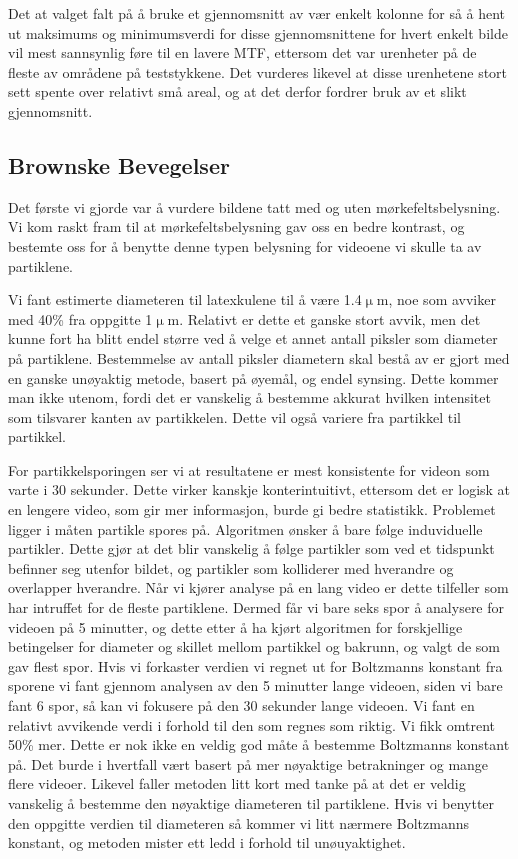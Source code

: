 \documentclass[a4paper,11pt, twocolumn]{article}
\begin{document}
Det at valget falt på å bruke et gjennomsnitt av vær enkelt kolonne for så å hent ut maksimums og minimumsverdi for disse gjennomsnittene for hvert enkelt bilde vil mest sannsynlig føre til en lavere MTF, ettersom det var urenheter på de fleste av områdene på teststykkene. Det vurderes likevel at disse urenhetene stort sett spente over relativt små areal, og at det derfor fordrer bruk av et slikt gjennomsnitt.

\subsection{Brownske Bevegelser}
Det første vi gjorde var å vurdere bildene tatt med og uten mørkefeltsbelysning. Vi kom raskt fram til at mørkefeltsbelysning gav oss en bedre kontrast, og bestemte oss for å benytte denne typen belysning for videoene vi skulle ta av partiklene.

Vi fant estimerte diameteren til latexkulene til å være 1.4$\upmu$m, noe som avviker med 40\% fra oppgitte 1$\upmu$m. Relativt er dette et ganske stort avvik, men det kunne fort ha blitt endel større ved å velge et annet antall piksler som diameter på partiklene. Bestemmelse av antall piksler diametern skal bestå av er gjort med en ganske unøyaktig metode, basert på øyemål, og endel synsing. Dette kommer man ikke utenom, fordi det er vanskelig å bestemme akkurat hvilken intensitet som tilsvarer kanten av partikkelen. Dette vil også variere fra partikkel til partikkel.

For partikkelsporingen ser vi at resultatene er mest konsistente for videon som varte i 30 sekunder. Dette virker kanskje  konterintuitivt, ettersom det er logisk at en lengere video, som gir mer informasjon, burde gi bedre statistikk. Problemet ligger i måten partikle spores på. Algoritmen ønsker å bare følge induviduelle partikler. Dette gjør at det blir vanskelig å følge partikler som ved et tidspunkt befinner seg utenfor bildet, og partikler som kolliderer med hverandre og overlapper hverandre. Når vi kjører analyse på en lang video er dette tilfeller som har intruffet for de fleste partiklene. Dermed får vi bare seks spor å analysere for videoen på 5 minutter, og dette etter å ha kjørt algoritmen for forskjellige betingelser for diameter og skillet mellom partikkel og bakrunn, og valgt de som gav flest spor. 
Hvis vi forkaster verdien vi regnet ut for Boltzmanns konstant fra sporene vi fant gjennom analysen av den 5 minutter lange videoen, siden vi bare fant 6 spor, så kan vi fokusere på den 30 sekunder lange videoen. Vi fant en relativt avvikende verdi i forhold til den som regnes som riktig. Vi fikk omtrent 50\% mer. Dette er nok ikke en veldig god måte å bestemme Boltzmanns konstant på. Det burde i hvertfall vært basert på mer nøyaktige betrakninger og mange flere videoer. Likevel faller metoden litt kort med tanke på at det er veldig vanskelig å bestemme den nøyaktige diameteren til partiklene. Hvis vi benytter den oppgitte verdien til diameteren så kommer vi litt nærmere Boltzmanns konstant, og metoden mister ett ledd i forhold til unøuyaktighet.
\end{document}
